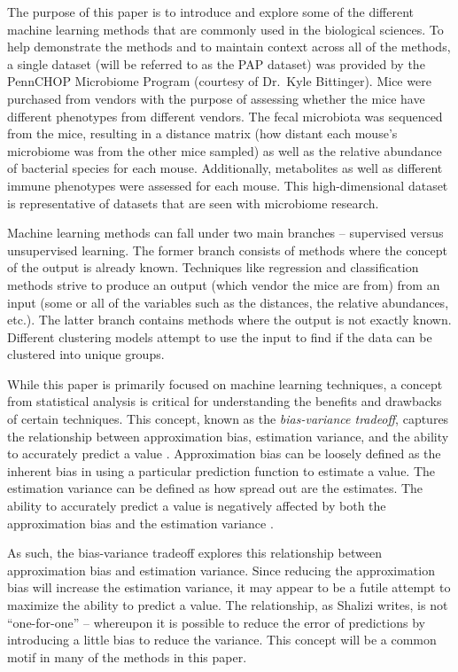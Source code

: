 \documentclass[12pt,openany]{book}
\begin{document}
The purpose of this paper is to introduce and explore some of the
different machine learning methods that are commonly used in the
biological sciences. To help demonstrate the methods and to maintain
context across all of the methods, a single dataset (will be referred to
as the PAP dataset) was provided by the PennCHOP Microbiome Program
(courtesy of Dr.~Kyle Bittinger). Mice were purchased from vendors with
the purpose of assessing whether the mice have different phenotypes from
different vendors. The fecal microbiota was sequenced from the mice,
resulting in a distance matrix (how distant each mouse's microbiome was
from the other mice sampled) as well as the relative abundance of
bacterial species for each mouse. Additionally, metabolites as well as
different immune phenotypes were assessed for each mouse. This
high-dimensional dataset is representative of datasets that are seen
with microbiome research.

Machine learning methods can fall under two main branches -- supervised
versus unsupervised learning. The former branch consists of methods
where the concept of the output is already known. Techniques like
regression and classification methods strive to produce an output (which
vendor the mice are from) from an input (some or all of the variables
such as the distances, the relative abundances, etc.). The latter branch
contains methods where the output is not exactly known. Different
clustering models attempt to use the input to find if the data can be
clustered into unique groups.

While this paper is primarily focused on machine learning techniques, a
concept from statistical analysis is critical for understanding the
benefits and drawbacks of certain techniques. This concept, known as the
\emph{bias-variance tradeoff}, captures the relationship between
approximation bias, estimation variance, and the ability to accurately
predict a value \citep{shalizi}. Approximation bias can be loosely
defined as the inherent bias in using a particular prediction function
to estimate a value. The estimation variance can be defined as how
spread out are the estimates. The ability to accurately predict a value
is negatively affected by both the approximation bias and the estimation
variance \citep{shalizi}.

As such, the bias-variance tradeoff explores this relationship between
approximation bias and estimation variance. Since reducing the
approximation bias will increase the estimation variance, it may appear
to be a futile attempt to maximize the ability to predict a value. The
relationship, as Shalizi writes, is not ``one-for-one'' \citep{shalizi}
-- whereupon it is possible to reduce the error of predictions by
introducing a little bias to reduce the variance. This concept will be a
common motif in many of the methods in this paper.
\end{document}

